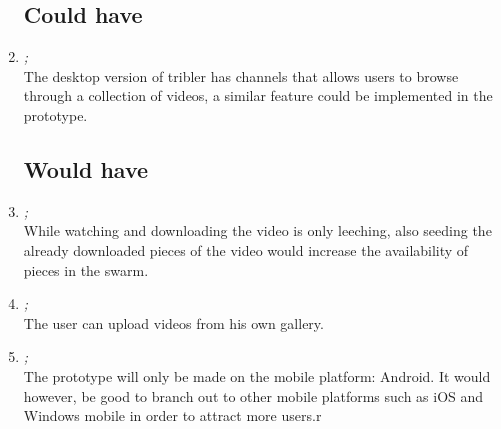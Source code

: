 \begin{enumerate}
\subsection{Could have}
\item \emph{;}\\
The desktop version of tribler has channels that allows users to browse through a collection of videos, a similar feature could be implemented in the prototype.

\subsection{Would have}
\item \emph{;}\\
While watching and downloading the video is only leeching, also seeding the already downloaded pieces of the video would increase the availability of pieces in the swarm.

\item \emph{;}\\
The user can upload videos from his own gallery.

\item \emph{;}\\
The prototype will only be made on the mobile platform: Android. It would however, be good to branch out to other mobile platforms such as iOS and Windows mobile in order to attract more users.r

\end{enumerate}

